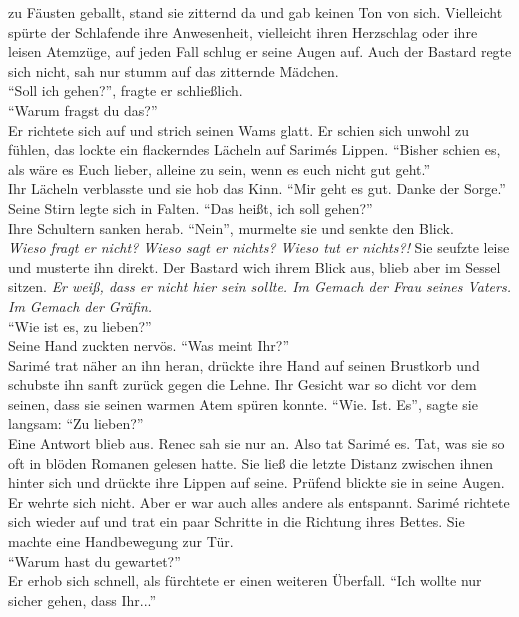 zu Fäusten geballt, stand sie zitternd da und gab keinen Ton von sich. Vielleicht spürte der 
Schlafende ihre Anwesenheit, vielleicht ihren Herzschlag oder ihre leisen Atemzüge, auf jeden Fall 
schlug er seine Augen auf. Auch der Bastard regte sich nicht, sah nur stumm auf das zitternde 
Mädchen. \\
``Soll ich gehen?'', fragte er schließlich.\\
``Warum fragst du das?''\\
Er richtete sich auf und strich seinen Wams glatt. Er schien sich unwohl zu fühlen, das lockte ein 
flackerndes Lächeln auf Sarimés Lippen. ``Bisher schien es, als wäre es Euch lieber, alleine zu 
sein, wenn es euch nicht gut geht.''\\
Ihr Lächeln verblasste und sie hob das Kinn. ``Mir geht es gut. Danke der Sorge.''\\
Seine Stirn legte sich in Falten. ``Das heißt, ich soll gehen?''\\
Ihre Schultern sanken herab. ``Nein'', murmelte sie und senkte den Blick.\\
\textit{Wieso fragt er nicht? Wieso sagt er nichts? Wieso tut er nichts?!} Sie seufzte leise und 
musterte ihn direkt. Der Bastard wich ihrem Blick aus, blieb aber im Sessel sitzen. \textit{Er 
weiß, dass er nicht hier sein sollte. Im Gemach der Frau seines Vaters. Im Gemach der Gräfin.}\\
``Wie ist es, zu lieben?''\\
Seine Hand zuckten nervös. ``Was meint Ihr?''\\
Sarimé trat näher an ihn heran, drückte ihre Hand auf seinen Brustkorb und schubste ihn sanft 
zurück gegen die Lehne. Ihr Gesicht war so dicht vor dem seinen, dass sie seinen warmen Atem spüren 
konnte. ``Wie. Ist. Es'', sagte sie langsam: ``Zu lieben?''\\
Eine Antwort blieb aus. Renec sah sie nur an. Also tat Sarimé es. Tat, was sie so oft in blöden 
Romanen gelesen hatte. Sie ließ die letzte Distanz zwischen ihnen hinter sich und drückte ihre 
Lippen auf seine. Prüfend blickte sie in seine Augen. Er wehrte sich nicht. Aber er war auch alles 
andere als entspannt. Sarimé richtete sich wieder auf und trat ein paar Schritte in die Richtung 
ihres Bettes. Sie machte eine Handbewegung zur Tür. \\
``Warum hast du gewartet?''\\
Er erhob sich schnell, als fürchtete er einen weiteren Überfall. ``Ich wollte nur sicher gehen, 
dass Ihr...'' \\
